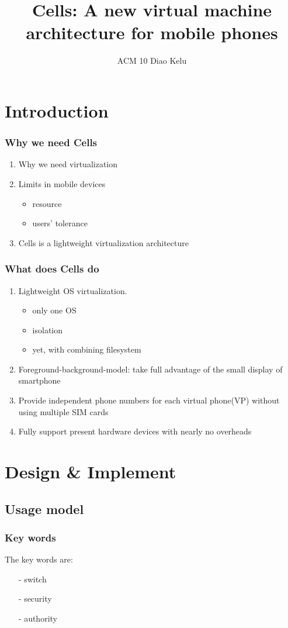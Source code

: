 \documentclass[utf8]{beamer}
\title{Cells: A new virtual machine architecture for mobile phones}
\author{ACM 10 \quad Diao Kelu}
\begin{document}
\begin{frame}
\titlepage
\end{frame}

\section{Introduction}
\begin{frame}
\frametitle{Why we need Cells}
\begin{enumerate}
\item<+-> Why we need virtualization
\item<+-> Limits in mobile devices
\begin{itemize}
\item<+-> resource
\item<+-> users' tolerance
\end{itemize}
\item<+-> Cells is a lightweight virtualization architecture
\end{enumerate}
\end{frame}

\begin{frame}
\frametitle{What does Cells do}
\begin{enumerate}
\item<+-> Lightweight OS virtualization.
    \begin{itemize}
    \item<+-> only one OS
    \item<+-> isolation
    \item<+-> yet, with combining filesystem
    \end{itemize}
\item<+-> Foreground-background-model: take full advantage of the small display of smartphone
\item<+-> Provide independent phone numbers for each virtual phone(VP) without using multiple SIM cards
\item<+-> Fully support present hardware devices with nearly no overheads
\end{enumerate}
\end{frame}

\section{Design \& Implement}
\subsection{Usage model}
\begin{frame}
\frametitle{Key words}
The key words are:
\begin{enumerate}
\item[-] switch
\item[-] security
\item[-] authority
\end{enumerate}
\end{frame}
\end{document}
